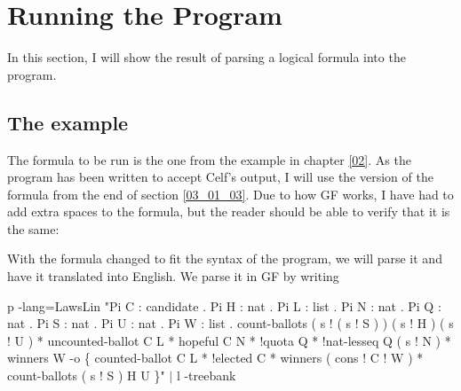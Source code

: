 \section{Running the Program}
\label{04_04}

In this section, I will show the result of parsing a logical formula into the program.

\subsection{The example}

The formula to be run is the one from the example in chapter \ref{02}. As the program has been written to accept Celf's output, I will use the version of the formula from the end of section \ref{03_01_03}. Due to how GF works, I have had to add extra spaces to the formula, but the reader should be able to verify that it is the same:

\begin{textoform}
\end{textoform}

With the formula changed to fit the syntax of the program, we will parse it and have it translated into English. We parse it in GF by writing
\begin{texto2}
p -lang=LawsLin "Pi C : candidate . Pi H : nat . Pi L : list . Pi N : nat . Pi Q : nat . Pi S : nat . Pi U : nat . Pi W : list . count-ballots ( s ! ( s ! S ) ) ( s ! H ) ( s ! U ) * uncounted-ballot C L * hopeful C N * !quota Q * !nat-lesseq Q ( s ! N ) * winners W -o \{ counted-ballot C L * !elected C * winners ( cons ! C ! W ) * count-ballots ( s ! S ) H U \}" $|$ l -treebank
\end{texto2}

